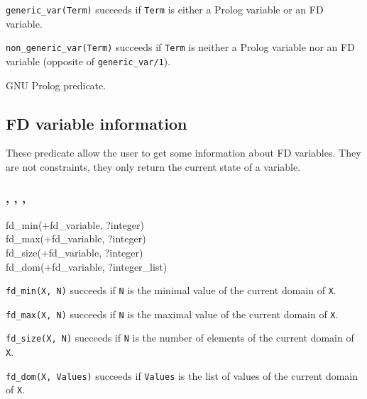 \texttt{generic\_var(Term)} succeeds if \texttt{Term} is
either a Prolog variable or an FD variable.

\texttt{non\_generic\_var(Term)} succeeds if
\texttt{Term} is neither a Prolog variable nor an FD variable
(opposite of \texttt{generic\_var/1}).

\PlErrorsNone

\Portability

GNU Prolog predicate.

\subsection{FD variable information}
These predicate allow the user to get some information about FD variables.
They are not constraints, they only return the current state of a variable.

\subsubsection{,
               ,
               ,
               }

\begin{TemplatesOneCol}
fd\_min(+fd\_variable, ?integer)\\
fd\_max(+fd\_variable, ?integer)\\
fd\_size(+fd\_variable, ?integer)\\
fd\_dom(+fd\_variable, ?integer\_list)

\end{TemplatesOneCol}

\Description

\texttt{fd\_min(X, N)} succeeds if \texttt{N} is the minimal value of the
current domain of \texttt{X}.

\texttt{fd\_max(X, N)} succeeds if \texttt{N} is the maximal value of the
current domain of \texttt{X}.

\texttt{fd\_size(X, N)} succeeds if \texttt{N} is the number of elements of
the current domain of \texttt{X}.

\texttt{fd\_dom(X, Values)} succeeds if \texttt{Values} is the list of
values of the current domain of \texttt{X}.

\begin{PlErrors}






\end{PlErrors}

